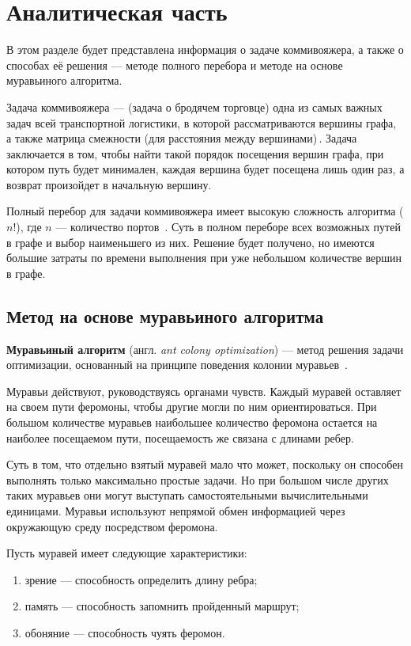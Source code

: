 \chapter{Аналитическая часть}
В этом разделе будет представлена информация о задаче коммивояжера,
а также о способах её решения — методе полного перебора и методе на основе муравьиного алгоритма.

Задача коммивояжера  --- (задача о бродячем торговце) одна из самых важных задач всей транспортной логистики, в которой рассматриваются вершины графа, а также матрица смежности (для расстояния между вершинами)\,\cite{task}.
Задача заключается в том, чтобы найти такой порядок посещения вершин графа, при котором путь будет минимален, каждая вершина будет посещена лишь один раз, а возврат произойдет в начальную вершину.

Полный перебор для задачи коммивояжера имеет высокую сложность алгоритма ($n!$), где $n$ --- количество портов~\cite{full-comb}.
Суть в полном переборе всех возможных путей в графе и выбор наименьшего из них.
Решение будет получено, но имеются большие затраты по времени выполнения при уже небольшом количестве вершин в графе.

\section{Метод на основе муравьиного алгоритма}

\textbf{Муравьиный алгоритм} (англ. \textit{ant colony optimization}) --- метод решения задачи оптимизации, основанный на принципе поведения колонии муравьев~\cite{full-comb}.

Муравьи действуют, руководствуясь органами чувств.
Каждый муравей оставляет на своем пути феромоны, чтобы другие могли по ним ориентироваться.
При большом количестве муравьев наибольшее количество феромона остается на наиболее посещаемом пути, посещаемость же связана с длинами ребер.

Суть в том, что отдельно взятый муравей мало что может, поскольку он способен выполнять только максимально простые задачи. Но при большом числе других таких муравьев они могут выступать самостоятельными вычислительными единицами. Муравьи используют непрямой обмен информацией через окружающую среду посредством феромона.

Пусть муравей имеет следующие характеристики:
\begin{enumerate}[label=\arabic*)]
	\item зрение --- способность определить длину ребра;
	\item память --- способность запомнить пройденный маршрут;
	\item обоняние --- способность чуять феромон.
\end{enumerate}


